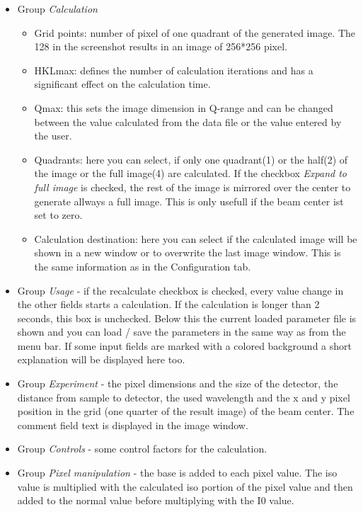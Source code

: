 \documentclass[11pt]{article} %
\begin{document}
\begin{itemize}
\item Group {\it Calculation}
	\begin{itemize}\itemsep0pt
	\item Grid points: number of pixel of one quadrant of the generated image. The 128 in the screenshot results in an image of 256*256 pixel.
	\item HKLmax: defines the number of calculation iterations and has a significant effect on the calculation time.
	\item Qmax: this sets the image dimension in Q-range and can be changed between the value calculated from the data file or the value entered by the user.
	\item Quadrants: here you can select, if only one quadrant(1) or the half(2) of the image or the full image(4) are calculated. If the checkbox {\it Expand to full image} is checked, the rest of the image is mirrored over the center to generate allways a full image. This is only usefull if the beam center ist set to zero.
	\item Calculation destination: here you can select if the calculated image will be shown in a new window or to overwrite the last image window. This is the same information as in the Configuration tab.
	\end{itemize}
\item Group {\it Usage} - if the recalculate checkbox is checked, every value change in the other fields starts a calculation. If the calculation is longer than 2 seconds, this box is unchecked. Below this the current loaded parameter file is shown and you can load / save the parameters in the same way as from the menu bar. If some input fields are marked with a colored background a short explanation will be displayed here too.
\item Group {\it Experiment} - the pixel dimensions and the size of the detector, the distance from sample to detector, the used wavelength and the x and y pixel position in the grid (one quarter of the result image) of the beam center. The comment field text is displayed in the image window.
\item Group {\it Controls} - some control factors for the calculation.
\item Group {\it Pixel manipulation} - the base is added to each pixel value. The iso value is multiplied with the calculated iso portion of the pixel value and then added to the normal value before multiplying with the I0 value.
\end{itemize}
\end{document}
